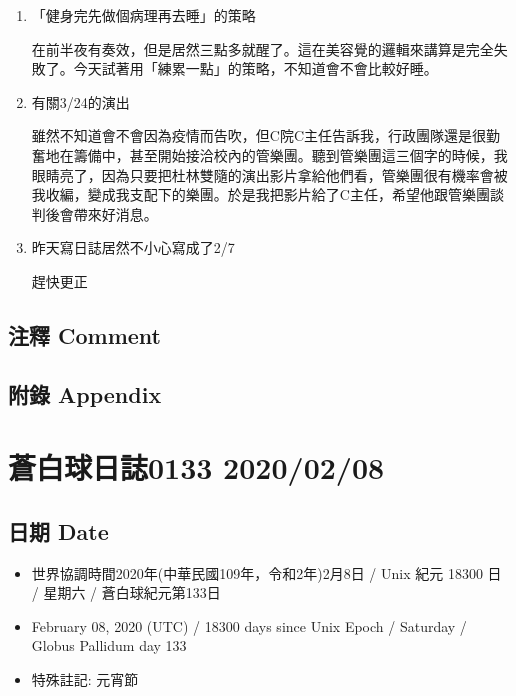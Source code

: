 \documentclass[
]{article}
\providecommand{\tightlist}{%
  \setlength{\itemsep}{0pt}\setlength{\parskip}{0pt}}
\begin{document}
\begin{enumerate}
\def\labelenumi{\arabic{enumi}.}
\item
  「健身完先做個病理再去睡」的策略

  在前半夜有奏效，但是居然三點多就醒了。這在美容覺的邏輯來講算是完全失敗了。今天試著用「練累一點」的策略，不知道會不會比較好睡。
\item
  有關3/24的演出

  雖然不知道會不會因為疫情而告吹，但C院C主任告訴我，行政團隊還是很勤奮地在籌備中，甚至開始接洽校內的管樂團。聽到管樂團這三個字的時候，我眼睛亮了，因為只要把杜林雙隨的演出影片拿給他們看，管樂團很有機率會被我收編，變成我支配下的樂團。於是我把影片給了C主任，希望他跟管樂團談判後會帶來好消息。
\item
  昨天寫日誌居然不小心寫成了2/7

  趕快更正
\end{enumerate}

\hypertarget{ux6ce8ux91cb-comment-67}{%
\subsection{注釋 Comment}\label{ux6ce8ux91cb-comment-67}}

\hypertarget{ux9644ux9304-appendix-68}{%
\subsection{附錄 Appendix}\label{ux9644ux9304-appendix-68}}

\hypertarget{ux84bcux767dux7403ux65e5ux8a8c0133-20200208}{%
\section{蒼白球日誌0133
2020/02/08}\label{ux84bcux767dux7403ux65e5ux8a8c0133-20200208}}

\hypertarget{ux65e5ux671f-date-69}{%
\subsection{日期 Date}\label{ux65e5ux671f-date-69}}

\begin{itemize}
\tightlist
\item
  世界協調時間2020年(中華民國109年，令和2年)2月8日 / Unix 紀元 18300 日
  / 星期六 / 蒼白球紀元第133日
\item
  February 08, 2020 (UTC) / 18300 days since Unix Epoch / Saturday /
  Globus Pallidum day 133
\item
  特殊註記: 元宵節
\end{itemize}
\end{document}
